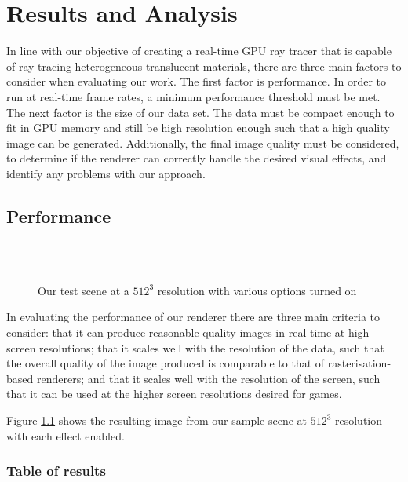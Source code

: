 \chapter{Results and Analysis}
\label{results}
In line with our objective of creating a real-time GPU ray tracer that is capable of ray tracing heterogeneous translucent materials, there are three main factors to consider when evaluating our work. The first factor is performance. In order to run at real-time frame rates, a minimum performance threshold must be met. The next factor is the size of our data set. The data must be compact enough to fit in GPU memory and still be high resolution enough such that a high quality image can be generated. Additionally, the final image quality must be considered, to determine if the renderer can correctly handle the desired visual effects, and identify any problems with our approach.

\section{Performance}
\label{sec:perf}

\begin{figure}
	\centering
	~
	\\
	~

	\caption{Our test scene at a $512^3$ resolution with various options turned on}
	\label{fig:performance-data}
\end{figure}

In evaluating the performance of our renderer there are three main criteria to consider: that it can produce reasonable quality images in real-time at high screen resolutions; that it scales well with the resolution of the data, such that the overall quality of the image produced is comparable to that of rasterisation-based renderers; and that it scales well with the resolution of the screen, such that it can be used at the higher screen resolutions desired for games.

Figure \ref{fig:performance-data} shows the resulting image from our sample scene at $512^3$ resolution with each effect enabled.

\subsection{Table of results}
\vspace{1em}

